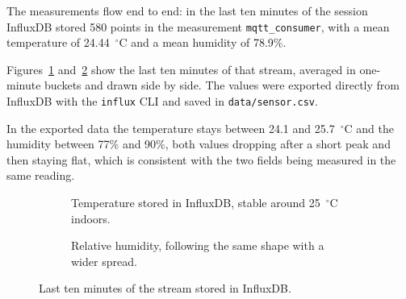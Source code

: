 \documentclass[11pt,a4paper]{article}
\begin{document}
The measurements flow end to end: in the last ten minutes of the session InfluxDB stored
580 points in the measurement \texttt{mqtt\_consumer}, with a mean temperature of
24.44~$^\circ$C and a mean humidity of 78.9\%.

Figures~\ref{fig:temp} and~\ref{fig:hum} show the last ten minutes of that stream, averaged
in one-minute buckets and drawn side by side. The values were exported directly from
InfluxDB with the \texttt{influx} CLI and saved in \texttt{data/sensor.csv}.

In the exported data the temperature stays between 24.1 and 25.7~$^\circ$C and the humidity
between 77\% and 90\%, both values dropping after a short peak and then staying flat, which
is consistent with the two fields being measured in the same reading.

\begin{figure}[ht]
\centering
\begin{subfigure}[b]{0.48\textwidth}
\centering
{}
\caption{Temperature stored in InfluxDB, stable around 25~$^\circ$C indoors.}
\label{fig:temp}
\end{subfigure}
\hfill
\begin{subfigure}[b]{0.48\textwidth}
\centering
{}
\caption{Relative humidity, following the same shape with a wider spread.}
\label{fig:hum}
\end{subfigure}
\caption{Last ten minutes of the stream stored in InfluxDB.}
\label{fig:plots}
\end{figure}
\end{document}
